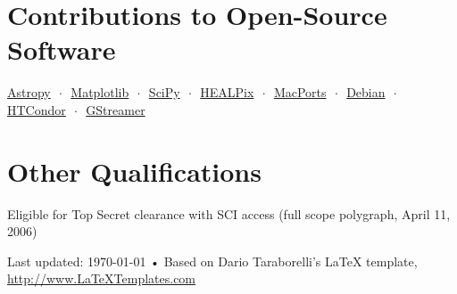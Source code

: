 \documentclass[10pt, letterpaper]{article} %
\newcommand{\listsep}{$\,\cdot\,$}
\begin{document}

\section*{Contributions to Open-Source Software}

\href{http://www.astropy.org}{Astropy} \listsep{} \href{http://matplotlib.org}{Matplotlib} \listsep{} \href{http://www.scipy.org}{SciPy} \listsep{} \href{http://healpix.jpl.nasa.gov}{HEALPix} \listsep{} \href{http://www.macports.org/}{MacPorts} \listsep{} \href{https://www.debian.org}{Debian} \listsep{} \href{http://research.cs.wisc.edu/htcondor/}{HTCondor} \listsep{} \href{http://gstreamer.net}{GStreamer}

\section*{Other Qualifications}

Eligible for Top Secret clearance with SCI access (full scope polygraph, April 11, 2006)

%

\vfill{} %


\begin{center}
{\scriptsize Last updated: \today\- •\- Based on Dario Taraborelli's LaTeX template, \href{http://www.LaTeXTemplates.com}{http://www.LaTeXTemplates.com}} %
\end{center}

\end{document}
